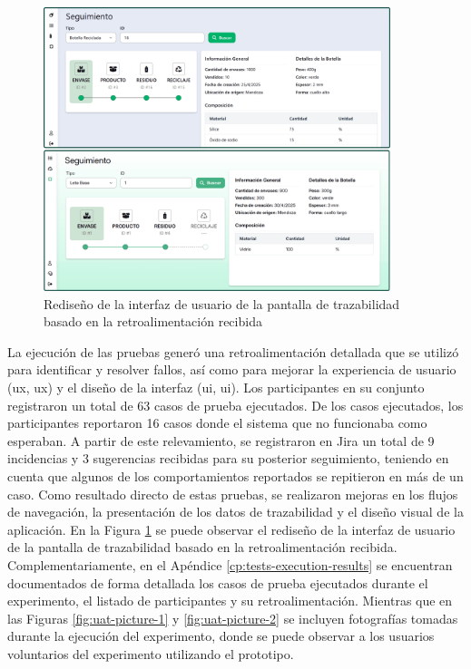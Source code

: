 \begin{figure}[!htb]
\centering
\includegraphics[width=0.9\textwidth]{Figures/uat-ui-redesign.png}
\caption{Rediseño de la interfaz de usuario de la pantalla de trazabilidad basado en la retroalimentación recibida}
\label{fig:uat-ui-redesign}
\end{figure}

La ejecución de las pruebas generó una retroalimentación detallada que se utilizó para identificar y resolver fallos, así como para mejorar la experiencia de usuario (\acrshort{ux}, \acrlong{ux}) y el diseño de la interfaz (\acrshort{ui}, \acrlong{ui}). Los participantes en su conjunto registraron un total de 63 casos de prueba ejecutados. De los casos ejecutados, los participantes reportaron 16 casos donde el sistema que no funcionaba como esperaban.
A partir de este relevamiento, se registraron en Jira un total de 9 incidencias y 3 sugerencias recibidas para su posterior seguimiento, teniendo en cuenta que algunos de los comportamientos reportados se repitieron en más de un caso. Como resultado directo de estas pruebas, se realizaron mejoras en los flujos de navegación, la presentación de los datos de \gls{trazabilidad} y el diseño visual de la aplicación. En la Figura \ref{fig:uat-ui-redesign} se puede observar el rediseño de la interfaz de usuario de la pantalla de trazabilidad basado en la retroalimentación recibida. Complementariamente, en el Apéndice \ref{cp:tests-execution-results} se encuentran documentados de forma detallada los casos de prueba ejecutados durante el experimento, el listado de participantes y su retroalimentación. Mientras que en las Figuras \ref{fig:uat-picture-1} y \ref{fig:uat-picture-2} se incluyen fotografías tomadas durante la ejecución del experimento, donde se puede observar a los usuarios voluntarios del experimento utilizando el prototipo.

